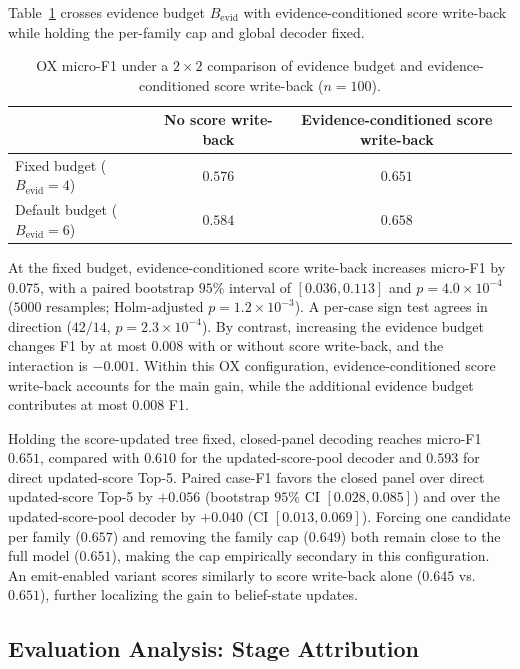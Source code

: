 \documentclass[letterpaper]{article} %
\begin{document}
Table~\ref{tab:state-2x2} crosses evidence budget $B_{\mathrm{evid}}$ with evidence-conditioned score write-back while holding the per-family cap and global decoder fixed.

\begin{table}[t]
\centering
\small
\begin{tabular}{lcc}
\toprule
 & No score write-back & Evidence-conditioned score write-back \\
\midrule
Fixed budget ($B_{\mathrm{evid}}{=}4$) & $0.576$ & $\mathbf{0.651}$ \\
Default budget ($B_{\mathrm{evid}}{=}6$) & $0.584$ & $0.658$ \\
\bottomrule
\end{tabular}
\caption{OX micro-F1 under a $2{\times}2$ comparison of evidence budget and evidence-conditioned score write-back ($n{=}100$).}
\label{tab:state-2x2}

\end{table}

At the fixed budget, evidence-conditioned score write-back increases micro-F1 by $0.075$, with a paired bootstrap $95\%$ interval of $[0.036,0.113]$ and $p=4.0{\times}10^{-4}$ ($5000$ resamples; Holm-adjusted $p=1.2{\times}10^{-3}$).
A per-case sign test agrees in direction ($42/14$, $p=2.3{\times}10^{-4}$).
By contrast, increasing the evidence budget changes F1 by at most $0.008$ with or without score write-back, and the interaction is $-0.001$.
Within this OX configuration, evidence-conditioned score write-back accounts for the main gain, while the additional evidence budget contributes at most $0.008$ F1.

Holding the score-updated tree fixed, closed-panel decoding reaches micro-F1 $0.651$, compared with $0.610$ for the updated-score-pool decoder and $0.593$ for direct updated-score Top-5.
Paired case-F1 favors the closed panel over direct updated-score Top-5 by $+0.056$ (bootstrap $95\%$ CI $[0.028,0.085]$) and over the updated-score-pool decoder by $+0.040$ (CI $[0.013,0.069]$).
Forcing one candidate per family ($0.657$) and removing the family cap ($0.649$) both remain close to the full model ($0.651$), making the cap empirically secondary in this configuration.
An emit-enabled variant scores similarly to score write-back alone ($0.645$ vs.\ $0.651$), further localizing the gain to belief-state updates.

\subsection{Evaluation Analysis: Stage Attribution}
\label{sec:res-tax}
\end{document}
